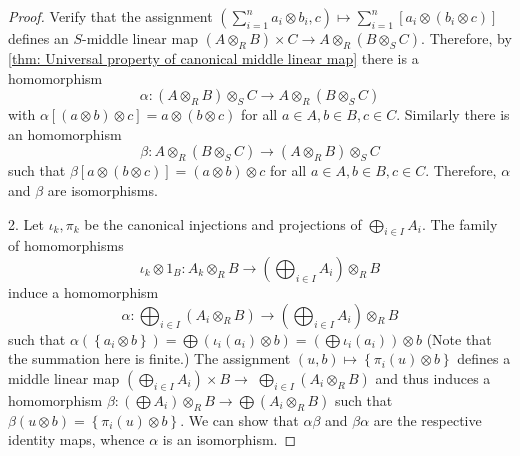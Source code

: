 \begin{theorem}
\begin{proof}
        Verify that the assignment $\left(\sum_{i=1}^n a_i \otimes b_i, c\right) \mapsto \sum_{i=1}^n\left[a_i \otimes\left(b_i \otimes c\right)\right]$ defines an $S$-middle linear map $\left(A \otimes_R B\right) \times C \rightarrow A \otimes_R\left(B \otimes_S C\right)$. Therefore, by \ref{thm: Universal property of canonical middle linear map} there is a homomorphism
        \begin{equation*}
            \alpha:\left(A \otimes_R B\right) \otimes_S C \rightarrow A \otimes_R\left(B \otimes_S C\right)
        \end{equation*}
        with $\alpha[(a \otimes b) \otimes c]=a \otimes(b \otimes c)$ for all $a \in A, b \in B, c \in C$.
        Similarly there is an homomorphism
        \begin{equation*}
            \beta: A \otimes_R\left(B \otimes_S C\right) \rightarrow\left(A \otimes_R B\right) \otimes_S C
        \end{equation*}
        such that $\beta[a \otimes(b \otimes c)]=(a \otimes b) \otimes c$ for all $a \in A, b \in B, c \in C$. Therefore, $\alpha$ and $\beta$ are isomorphisms.

        2.
        Let $\iota_k, \pi_k$ be the canonical injections and projections of $\bigoplus_{i \in I} A_i$.
        The family of homomorphisms
        \begin{equation*}
            \iota_k \otimes 1_B: A_k \otimes_R B \rightarrow\left(\bigoplus_{i \in I} A_i\right) \otimes_R B
        \end{equation*}
        induce a homomorphism
        \begin{equation*}
            \alpha:
            \bigoplus_{i \in I}\left(A_i \otimes_R B\right)
            \rightarrow
            \left(\bigoplus_{i \in I} A_i\right) \otimes_R B
        \end{equation*}
        such that
        $\alpha\left(\left\{a_i \otimes b\right\}\right)
            =
            \bigoplus\left(\iota_i\left(a_i\right) \otimes b\right)=
            \left(\bigoplus \iota_i\left(a_i\right)\right) \otimes b$ (Note that the summation here is finite.)
        The assignment $(u, b) \mapsto\left\{\pi_i(u) \otimes b\right\}$ defines a middle linear map $\left(\bigoplus_{i \in I} A_i\right) \times B \rightarrow$ $\bigoplus_{i \in I}\left(A_i \otimes_R B\right)$ and thus induces a homomorphism $\beta:\left(\bigoplus A_i\right) \otimes_R B \rightarrow \bigoplus\left(A_i \otimes_R B\right)$ such that $\beta(u \otimes b)=\left\{\pi_i(u) \otimes b\right\}$.
        We can show that $\alpha \beta$ and $\beta \alpha$ are the respective identity maps, whence $\alpha$ is an isomorphism.
    \end{proof}
\end{theorem}



